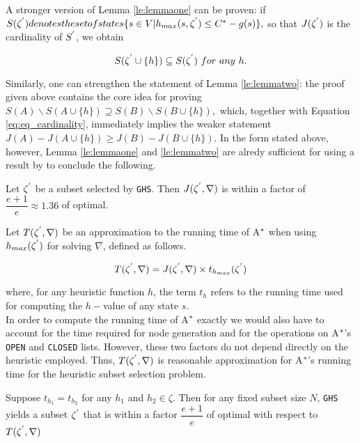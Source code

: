 A stronger version of Lemma \ref{le:lemmaone} can be proven: if $S(\zeta\sp{'}) denotes the set of states \{s \in V | h_{max}(s,\zeta\sp{'}) \leq C\sp{*} - g(s)\},$ so that $J(\zeta\sp{'})$ is the cardinality of $S\sp{'}$, we obtain

\begin{equation}
S(\zeta\sp{'} \cup \{h\}) \subseteq S(\zeta\sp{'})\ for\  any\ h.
\label{eq:eq_cardinality}
\end{equation}

Similarly, one can strengthen the statement of Lemma \ref{le:lemmatwo}: the proof given above contains the core idea for proving $S(A) \backslash S(A \cup \{h\}) \supseteq S(B) \backslash S(B \cup \{h\}),$ which, together with Equation \ref{eq:eq_cardinality}, immediately implies the weaker statement $J(A) - J(A \cup \{h\}) \geq J(B) - J(B \cup \{h\}).$ In the form stated above, however, Lemma \ref{le:lemmaone} and \ref{le:lemmatwo} are alredy sufficient for using a result by \cite{nemhauser1978analysis} to conclude the following.

\begin{theorem}
Let $\zeta\sp{'}$ be a subset selected by \texttt{GHS}. Then $J(\zeta\sp{'}, \nabla)$ is within a factor of $\dfrac{e+1}{e} \approx 1.36$ of optimal.
\label{th:theorem_one}
\end{theorem}

Let $T(\zeta\sp{'},\nabla)$ be an approximation to the running time of A$\sp{*}$ when using $h_{max}(\zeta\sp{'})$ for solving $\nabla$, defined as follows.

\begin{equation}
T(\zeta\sp{'}, \nabla) = J(\zeta\sp{'},\nabla) \times t_{h_{max}}(\zeta\sp{'})
\label{eq:eq_time_solving}
\end{equation}

where, for any heuristic function $h$, the term $t_{h}$ refers to the running time used for computing the $h-$value of any state $s$. \\
In order to compute the running time of A$\sp{*}$ exactly we would also have to account for the time required for node generation and for the operations on A$\sp{*}$'s \texttt{OPEN} and \texttt{CLOSED} lists. However, these two factors do not depend directly on the heuristic employed. Thus, $T(\zeta\sp{'},\nabla)$ is reasonable approximation for A$\sp{*}$'s running time for the heuristic subset selection problem.

\begin{theorem}
Suppose $t_{h_{1}} = t_{h_{2}}$ for any $h_{1}$ and $h_{2} \in \zeta$. Then for any fixed subset size $N$, \texttt{GHS} yields a subset $\zeta\sp{'}$ that is within a factor $\dfrac{e+1}{e}$ of optimal with respect to $T(\zeta\sp{'},\nabla)$
\label{th:theorem_two}
\end{theorem}

